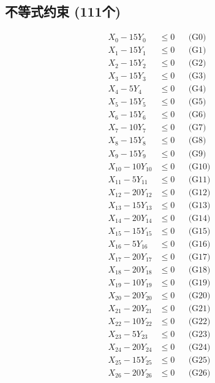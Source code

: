 \documentclass[a4paper,10pt]{article}
\begin{document}
\subsection{不等式约束 (111个)}

\allowdisplaybreaks
{\small
\begin{align}
X_{0} - 15Y_{0} &\leq 0 && \text{(G0)} \\
X_{1} - 15Y_{1} &\leq 0 && \text{(G1)} \\
X_{2} - 15Y_{2} &\leq 0 && \text{(G2)} \\
\allowbreak
X_{3} - 15Y_{3} &\leq 0 && \text{(G3)} \\
X_{4} - 5Y_{4} &\leq 0 && \text{(G4)} \\
X_{5} - 15Y_{5} &\leq 0 && \text{(G5)} \\
X_{6} - 15Y_{6} &\leq 0 && \text{(G6)} \\
X_{7} - 10Y_{7} &\leq 0 && \text{(G7)} \\
X_{8} - 15Y_{8} &\leq 0 && \text{(G8)} \\
X_{9} - 15Y_{9} &\leq 0 && \text{(G9)} \\
X_{10} - 10Y_{10} &\leq 0 && \text{(G10)} \\
X_{11} - 5Y_{11} &\leq 0 && \text{(G11)} \\
X_{12} - 20Y_{12} &\leq 0 && \text{(G12)} \\
\allowbreak
X_{13} - 15Y_{13} &\leq 0 && \text{(G13)} \\
X_{14} - 20Y_{14} &\leq 0 && \text{(G14)} \\
X_{15} - 15Y_{15} &\leq 0 && \text{(G15)} \\
X_{16} - 5Y_{16} &\leq 0 && \text{(G16)} \\
X_{17} - 20Y_{17} &\leq 0 && \text{(G17)} \\
X_{18} - 20Y_{18} &\leq 0 && \text{(G18)} \\
X_{19} - 10Y_{19} &\leq 0 && \text{(G19)} \\
X_{20} - 20Y_{20} &\leq 0 && \text{(G20)} \\
X_{21} - 20Y_{21} &\leq 0 && \text{(G21)} \\
X_{22} - 10Y_{22} &\leq 0 && \text{(G22)} \\
\allowbreak
X_{23} - 5Y_{23} &\leq 0 && \text{(G23)} \\
X_{24} - 20Y_{24} &\leq 0 && \text{(G24)} \\
X_{25} - 15Y_{25} &\leq 0 && \text{(G25)} \\
X_{26} - 20Y_{26} &\leq 0 && \text{(G26)} \\

\end{align}}
\end{document}
